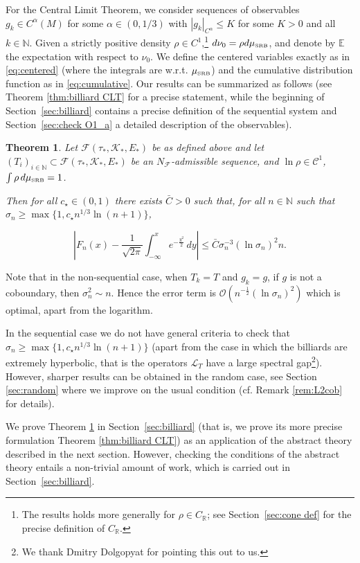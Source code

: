 \documentclass{amsart}
\numberwithin{equation}{section}
\newtheorem{thm}{Theorem}[section]
\newcommand\cC{{\mathcal C}}
\newcommand\cF{{\mathcal F}}
\newcommand\cK{{\mathcal K}}
\newcommand\cL{{\mathcal L}}
\newcommand\cO{{\mathcal O}}
\newcommand\bR{{\mathbb R}}
\newcommand{\musrb}{\mu_{\mbox{\tiny SRB}}}
\begin{document}
For the Central Limit Theorem, we consider sequences of observables $g_k \in C^\alpha(M)$ for some $\alpha \in (0, 1/3)$
with $|g_k|_{C^\alpha} \le K$ for some $K>0$ and all $k \in \mathbb{N}$.  Given a strictly positive density $\rho \in C^1$,\footnote{The results holds more generally for $\rho\in C_{\bR}$; see
Section~\ref{sec:cone def} for the precise definition of $C_{\bR}$.} $d\nu_0 = \rho d\musrb$, and denote
by $\mathbb{E}$ the expectation with respect to $\nu_0$. We define the centered variables exactly as in \eqref{eq:centered} (where the integrals are w.r.t. $\musrb$) and the cumulative distribution function as in \eqref{eq:cumulative}. Our results can be summarized as follows (see Theorem \ref{thm:billiard CLT} for a precise statement, while the beginning of Section~\ref{sec:billiard} contains a precise definition of the sequential system and Section~\ref{sec:check O1_a} a detailed description of the observables).
\begin{thm}
\label{thm:sample}
Let $\cF(\tau_*, \cK_*, E_*)$ be as defined above and let $(T_i)_{i \in \mathbb{N}} \subset \cF(\tau_*, \cK_*, E_*)$
be an $N_{\cF}$-admissible sequence, and $\ln \rho \in \cC^1$, $\int \rho \, d\musrb=1$. 

Then for all $c_\star \in (0,1)$ there exists $\bar C >0$ such that, for all $n \in \mathbb{N}$ such that $\sigma_n \ge \max \{ 1, c_\star n^{1/3} \ln(n+1) \}$,

\[
\left| F_n(x) - \frac{1}{\sqrt{2\pi}} \int_{-\infty}^x e^{-\frac{y^2}{2} } \, dy \right| \le \bar{C} \sigma_n^{-3} (\ln \sigma_n)^2 n .
\]
\end{thm}
Note that in the non-sequential case, when $T_k=T$ and $g_k=g$, if $g$ is not a coboundary, then $\sigma_n^2\sim n$. Hence the error term is $\cO(n^{-\frac 12} (\ln \sigma_n)^2)$ which is optimal, apart from the logarithm.

In the sequential case we do not have general criteria to check that $\sigma_n \ge \max \{ 1, c_\star n^{1/3} \ln(n+1) \}$ (apart from the case in which the billiards are extremely hyperbolic, that is the operators $\cL_{T}$ have a large spectral gap\footnote{We thank Dmitry Dolgopyat for pointing this out to us.}).
However, sharper results can be obtained in the random case, see Section \ref{sec:random} where we improve on the usual condition (cf. Remark  \ref{rem:L2cob} for details).

We prove Theorem \ref{thm:sample} in Section~\ref{sec:billiard} (that is, we prove its more precise formulation Theorem \ref{thm:billiard CLT}) as an application of the abstract theory described in the next section. However, checking the conditions of the abstract theory entails a non-trivial amount of work, which is carried out in  Section~\ref{sec:billiard}.
\end{document}
